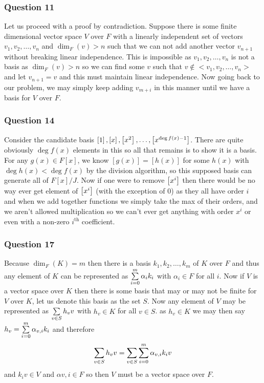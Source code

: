 \documentclass{article}
\begin{document}
\subsubsection{Question 11}
Let us proceed with a proof by contradiction. Suppose there is some finite dimensional vector space $V$ over $F$ with a linearly independent set of vectors $v_1,v_2,\ldots, v_n$ and $\dim_F(v) > n$ such that we can not add another vector $v_{n+1}$ without breaking linear independence. This is impossible as $v_1,v_2,\ldots,v_n$ is not a basis as $\dim_F(v)>n$ so we can find some $v$ such that $v \not\in<v_1,v_2,\ldots,v_n>$ and let $v_{n+1} = v$ and this must maintain linear independence. Now going back to our problem, we may simply keep adding $v_{m+i}$ in this manner until we have a basis for $V$ over $F$.

\subsubsection{Question 14}
Consider the candidate basis $\left[{1}\right], \left[{x}\right], \left[{x^2}\right], \ldots, \left[{x^{\deg f(x) - 1}}\right]$. There are quite obviously $\deg f(x)$ elements in this so all that remains is to show it is a basis. For any $g(x) \in F[x]$, we know $[g(x)] = [h(x)]$ for some $h(x)$ with $\deg h(x) < \deg f(x)$ by the division algorithm, so this supposed basis can generate all of $F[x]/J$. Now if one were to remove $\left[{x^i}\right]$ then there would be no way ever get element of $\left[{x^i}\right]$ (with the exception of 0) as they all have order $i$ and when we add together functions we simply take the max of their orders, and we aren't allowed multiplication so we can't ever get anything with order $x^i$ or even with a non-zero $i^{\text{th}}$ coefficient.

\subsubsection{Question 17}
 Because $\dim_F(K) = m$ then there is a basis $k_1,k_2,\ldots,k_m$ of $K$ over $F$ and thus any element of $K$ can be represented as $ \sum\limits_{i=0}^{m}  {\alpha_ik_i} $ with $\alpha_i \in F$ for all $i$. Now if $V$ is a vector space over $K$ then there is some basis that may or may not be finite for $V$ over $K$, let us denote this basis as the set $S$. Now any element of $V$ may be represented as $\sum\limits_{v \in S}^{}  {h_vv} $ with $h_v \in K$ for all $v\in S$. as $h_v \in K$ we may then say $h_v = \sum\limits_{i=0}^{m}  {\alpha_{v,i}k_i} $ and therefore $$\sum\limits_{v\in S}^{}  {h_vv}  = \sum\limits_{v\in S}^{}  {\sum\limits_{i=0}^{m}  {\alpha_{v,i}k_i}  v} $$ and $k_iv \in V$ and $\alpha{v,i}\in F$ so then $V$ must be a vector space over $F$.
\end{document}
